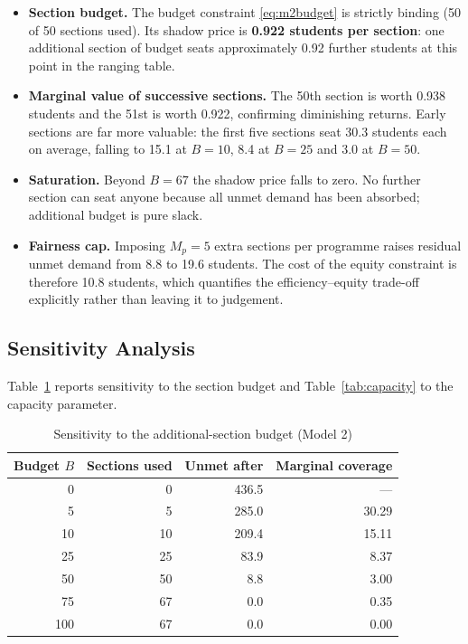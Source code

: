 \documentclass[conference]{IEEEtran}
\begin{document}
\begin{itemize}
\item \textbf{Section budget.} The budget constraint \eqref{eq:m2budget} is strictly
      binding (50 of 50 sections used). Its shadow price is \textbf{0.922 students per
      section}: one additional section of budget seats approximately 0.92 further
      students at this point in the ranging table.
\item \textbf{Marginal value of successive sections.} The 50th section is worth 0.938
      students and the 51st is worth 0.922, confirming diminishing returns. Early
      sections are far more valuable: the first five sections seat 30.3 students each on
      average, falling to 15.1 at $B=10$, 8.4 at $B=25$ and 3.0 at $B=50$.
\item \textbf{Saturation.} Beyond $B = 67$ the shadow price falls to zero. No further
      section can seat anyone because all unmet demand has been absorbed; additional
      budget is pure slack.
\item \textbf{Fairness cap.} Imposing $M_p = 5$ extra sections per programme raises
      residual unmet demand from 8.8 to 19.6 students. The cost of the equity
      constraint is therefore 10.8 students, which quantifies the efficiency--equity
      trade-off explicitly rather than leaving it to judgement.
\end{itemize}

\subsection{Sensitivity Analysis}

Table~\ref{tab:budget} reports sensitivity to the section budget and
Table~\ref{tab:capacity} to the capacity parameter.

\begin{table}[htbp]
\caption{Sensitivity to the additional-section budget (Model 2)}
\label{tab:budget}
\centering
\small
\begin{tabular}{rrrr}
\toprule
Budget $B$ & Sections used & Unmet after & Marginal coverage \\
\midrule
0   & 0  & 436.5 & --- \\
5   & 5  & 285.0 & 30.29 \\
10  & 10 & 209.4 & 15.11 \\
25  & 25 & 83.9  & 8.37 \\
50  & 50 & 8.8   & 3.00 \\
75  & 67 & 0.0   & 0.35 \\
100 & 67 & 0.0   & 0.00 \\
\bottomrule
\end{tabular}
\end{table}
\end{document}
